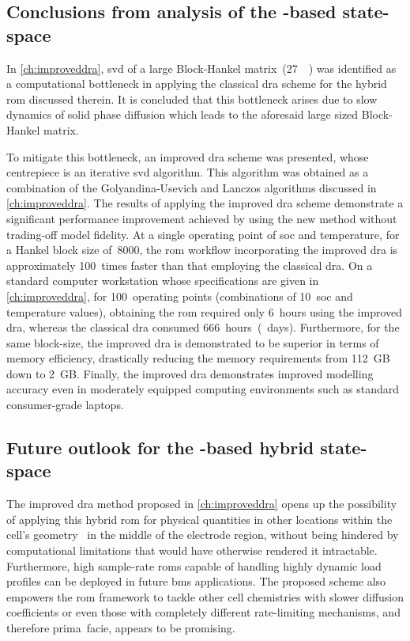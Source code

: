 \subsection{Conclusions from analysis of the -based state-space }
\addlines[0.5]

In \cref{ch:improveddra}, \gls{svd} of a large Block-Hankel
matrix~(\approx\SI{27}{\giga\byte}) was identified as a computational bottleneck
in applying the classical \gls{dra} scheme for the hybrid \gls{rom} discussed
therein. It is concluded that this bottleneck arises due  to slow dynamics
of  solid phase diffusion  which leads  to the aforesaid large sized
Block-Hankel matrix.

To mitigate this  bottleneck, an improved \gls{dra} scheme  was presented, whose
centrepiece is an iterative \gls{svd}  algorithm. This algorithm was obtained as
a  combination of  the Golyandina-Usevich  and Lanczos  algorithms discussed  in
\cref{ch:improveddra}.  The results  of applying  the improved  \gls{dra} scheme
demonstrate  a significant  performance improvement  achieved by  using the  new
method  without trading-off  model  fidelity.  At a  single  operating point  of
\gls{soc}  and temperature,  for  a  Hankel block  size  of~8000, the  \gls{rom}
workflow incorporating the improved  \gls{dra} is approximately 100~times faster
than that employing the classical  \gls{dra}. On a standard computer workstation
whose  specifications  are  given in  \cref{ch:improveddra},  for  100~operating
points  (combinations of  10~\gls{soc}  and temperature  values), obtaining  the
\gls{rom}  required  only 6~hours  using  the  improved \gls{dra},  whereas  the
classical \gls{dra}  consumed 666~hours~(~days). Furthermore,  for the
same block-size, the improved \gls{dra} is  demonstrated to be superior in terms
of memory efficiency,  drastically reducing the memory  requirements from 112~GB
down to  2~GB. Finally, the  improved \gls{dra} demonstrates  improved modelling
accuracy even  in moderately  equipped computing  environments such  as standard
consumer-grade laptops.

\subsection{Future outlook for the -based hybrid state-space }

The improved  \gls{dra} method  proposed in  \cref{ch:improveddra} opens  up the
possibility of  applying this hybrid \gls{rom}  for physical quantities in other
locations within the  cell's geometry \eg~in the  middle of the electrode
region,  without being hindered by  computational limitations that would  have
otherwise  rendered  it intractable.  Furthermore, high  sample-rate \glspl{rom}
capable of handling highly dynamic  load profiles can be deployed in future
\gls{bms} applications.  The proposed scheme also  empowers the \gls{rom}
framework to tackle other cell chemistries with slower diffusion coefficients or
even  those with  completely different  rate-limiting mechanisms,  and therefore
prima~facie, appears to be promising.

